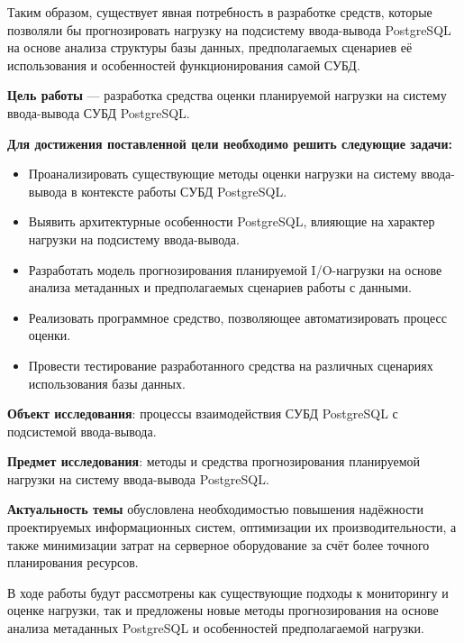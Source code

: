 Та\-ким об\-ра\-зом, су\-ще\-ству\-ет яв\-ная по\-треб\-ность в раз\-ра\-бот\-ке средств, ко\-то\-рые поз\-во\-ля\-ли 
бы про\-гно\-зи\-ро\-вать на\-груз\-ку на под\-си\-сте\-му вво\-да-вы\-во\-да Post\-gre\-SQL на ос\-но\-ве ана\-ли\-за 
струк\-ту\-ры ба\-зы дан\-ных, пред\-по\-ла\-га\-е\-мых сце\-на\-ри\-ев её ис\-поль\-зо\-ва\-ния и осо\-бен\-но\-стей 
функ\-ци\-о\-ни\-ро\-ва\-ния са\-мой \mbox{СУБД}.
\vspace{5mm}

\textbf{Цель работы} — разработка средства оценки планируемой нагрузки на систему ввода-вывода СУБД PostgreSQL.\

\vspace{5mm}

\textbf{Для достижения поставленной цели необходимо решить следующие задачи:}
\begin{itemize}[leftmargin=*,align=left]
    \item Про\-анализи\-ровать су\-ще\-ствую\-щие ме\-то\-ды оцен\-ки на\-груз\-ки на си\-сте\-му вво\-да-вы\-во\-да в кон\-тек\-сте ра\-бо\-ты \mbox{СУБД} PostgreSQL.\
    \item Вы\-я\-вить ар\-хи\-тек\-тур\-ные осо\-бен\-но\-сти Post\-gre\-SQL, вли\-яю\-щие на ха\-рак\-тер на\-груз\-ки на под\-си\-сте\-му вво\-да-вы\-во\-да.\
    \item Раз\-ра\-бо\-тать мо\-дель про\-гно\-зи\-ро\-ва\-ния пла\-ни\-ру\-е\-мой I/O-на\-груз\-ки на ос\-но\-ве ана\-ли\-за ме\-та\-дан\-ных и пред\-по\-ла\-га\-е\-мых сце\-на\-ри\-ев ра\-бо\-ты с дан\-ны\-ми.\
    \item Ре\-а\-ли\-зо\-вать про\-грамм\-ное сред\-ство, по\-зво\-ля\-ю\-щее ав\-то\-ма\-ти\-зи\-ро\-вать про\-цесс оцен\-ки.\
    \item Про\-вес\-ти тес\-ти\-ро\-ва\-ние раз\-ра\-бо\-тан\-но\-го сред\-ства на раз\-лич\-ных сце\-на\-ри\-ях ис\-поль\-зо\-ва\-ния ба\-зы дан\-ных.\
\end{itemize}

\vspace{5mm}

\textbf{Объект исследования}: процессы взаимодействия СУБД PostgreSQL с подсистемой ввода-вывода.

\textbf{Предмет исследования}: методы и средства прогнозирования планируемой нагрузки на систему ввода-вывода PostgreSQL.

\vspace{5mm}

\textbf{Актуальность темы} обусловлена необходимостью повышения надёжности проектируемых информационных систем, оптимизации их производительности, а также минимизации затрат на серверное оборудование за счёт более точного планирования ресурсов.

\vspace{5mm}

В ходе работы будут рассмотрены как существующие подходы к мониторингу и оценке нагрузки, так и предложены новые методы прогнозирования на основе анализа метаданных PostgreSQL и особенностей предполагаемой нагрузки.
